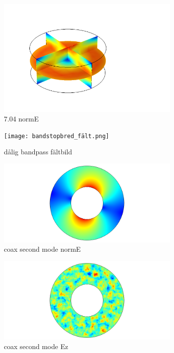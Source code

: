 \documentclass[a4paper]{article}
\begin{document}
\begin{figure}[h]
	\centering
	\includegraphics[width=0.8\textwidth]{7_04_normE.png}
	\caption{7.04 normE}
	\label{fig:704norme}
\end{figure}

\begin{figure}[h]
	\centering
	\texttt{[image: bandstopbred\_fält.png]}
	\caption{dålig bandpass fältbild}
	\label{fig:bandpassfält}
\end{figure}

\begin{figure}[h]
	\centering
	\includegraphics[width=0.8\textwidth]{coax_second_mode_normE.png}
	\caption{coax second mode normE}
	\label{fig:coaxnorme}
\end{figure}

\begin{figure}[h]
	\centering
	\includegraphics[width=0.8\textwidth]{coax_second_mode_Ez.png}
	\caption{coax second mode Ez}
	\label{fig:coaxez}
\end{figure}
\end{document}
